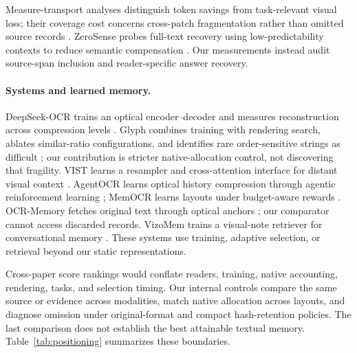 \documentclass{article}
\begin{document}
Measure-transport analyses distinguish token savings from task-relevant visual loss; their coverage cost concerns cross-patch fragmentation rather than omitted source records \citep{measuretransport}. ZeroSense probes full-text recovery using low-predictability contexts to reduce semantic compensation \citep{zerosense}. Our measurements instead audit source-span inclusion and reader-specific answer recovery.

\begin{table}[t]
\centering\footnotesize
\caption{\textbf{Closest prior work and the comparison tested here.} This is a protocol map, not a cross-paper score ranking. The final column states this study's distinct \emph{measurement}, without claiming that earlier work lacked all related controls.}
\label{tab:positioning}

\end{table}

\paragraph{Systems and learned memory.}
DeepSeek-OCR trains an optical encoder--decoder and measures reconstruction across compression levels \citep{deepseekocr}. Glyph combines training with rendering search, ablates similar-ratio configurations, and identifies rare order-sensitive strings as difficult \citep{glyph}; our contribution is stricter native-allocation control, not discovering that fragility. VIST learns a resampler and cross-attention interface for distant visual context \citep{vist}. AgentOCR learns optical history compression through agentic reinforcement learning \citep{agentocr}; MemOCR learns layouts under budget-aware rewards \citep{memocr}. OCR-Memory fetches original text through optical anchors \citep{ocrmemory}; our comparator cannot access discarded records. VizoMem trains a visual-note retriever for conversational memory \citep{vizomem}. These systems use training, adaptive selection, or retrieval beyond our static representations.

Cross-paper score rankings would conflate readers, training, native accounting, rendering, tasks, and selection timing. Our internal controls compare the same source or evidence across modalities, match native allocation across layouts, and diagnose omission under original-format and compact hash-retention policies. The last comparison does not establish the best attainable textual memory. Table~\ref{tab:positioning} summarizes these boundaries.
\end{document}
